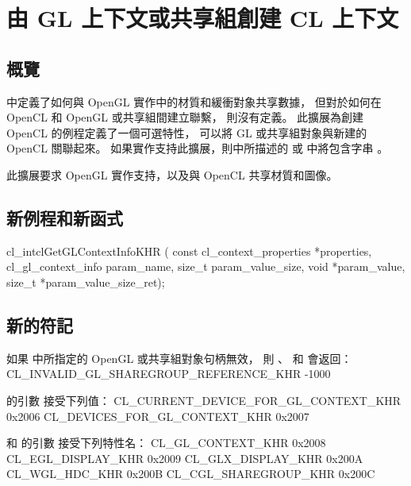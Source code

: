 \section{由 GL 上下文或共享組創建 CL 上下文}

\subsection{概覽}

中定義了如何與 OpenGL 實作中的材質和緩衝對象共享數據，
但對於如何在 OpenCL 和 OpenGL 或共享組間建立聯繫，
則沒有定義。
此擴展為創建 OpenCL 的例程定義了一個可選特性，
可以將 GL 或共享組對象與新建的 OpenCL 關聯起來。
如果實作支持此擴展，則中所描述的  或
 中將包含字串 。

此擴展要求 OpenGL 實作支持，以及與 OpenCL 共享材質和圖像。

\subsection{新例程和新函式}

\startclc
cl_intclGetGLContextInfoKHR (
		const cl_context_properties *properties,
		cl_gl_context_info param_name,
		size_t param_value_size,
		void *param_value,
		size_t *param_value_size_ret);
\stopclc

\subsection{新的符記}

如果  中所指定的 OpenGL 或共享組對象句柄無效，
則 、  和  會返回：
\startclc
CL_INVALID_GL_SHAREGROUP_REFERENCE_KHR		-1000
\stopclc

 的引數  接受下列值：
\startclc
CL_CURRENT_DEVICE_FOR_GL_CONTEXT_KHR		0x2006
CL_DEVICES_FOR_GL_CONTEXT_KHR			0x2007
\stopclc

 和  的引數  接受下列特性名：
\startclc
CL_GL_CONTEXT_KHR	0x2008
CL_EGL_DISPLAY_KHR	0x2009
CL_GLX_DISPLAY_KHR	0x200A
CL_WGL_HDC_KHR		0x200B
CL_CGL_SHAREGROUP_KHR	0x200C
\stopclc

